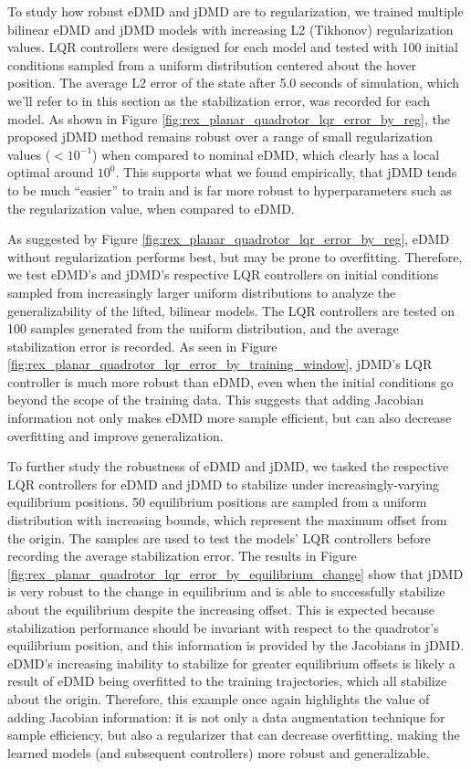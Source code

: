 \documentclass{article}
\begin{document}
To study how robust eDMD and jDMD are to regularization, we trained multiple bilinear eDMD
and jDMD models with increasing L2 (Tikhonov) regularization values. LQR controllers were
designed for each model and tested with 100 initial conditions sampled from a uniform
distribution centered about the hover position. The average L2 error of the state after 5.0
seconds of simulation, which we'll refer to in this section as the stabilization error, was
recorded for each model. As shown in Figure
\ref{fig:rex_planar_quadrotor_lqr_error_by_reg}, the proposed jDMD method remains robust
over a range of small regularization values ($<10^{-1}$) when compared to nominal eDMD, which 
clearly has a local optimal around $10^0$. This supports what we found empirically, that 
jDMD tends to be much ``easier'' to train and is far more robust to hyperparameters such as 
the regularization value, when compared to eDMD.

As suggested by Figure \ref{fig:rex_planar_quadrotor_lqr_error_by_reg}, eDMD without
regularization performs best, but may be prone to overfitting. Therefore, we test eDMD's and
jDMD's respective LQR controllers on initial conditions sampled from increasingly larger
uniform distributions to analyze the generalizability of the lifted, bilinear models. The
LQR controllers are tested on 100 samples generated from the uniform distribution, and the
average stabilization error is recorded. As seen in Figure
\ref{fig:rex_planar_quadrotor_lqr_error_by_training_window}, jDMD's LQR controller is much
more robust than eDMD, even when the initial conditions go beyond the scope of the training
data. This suggests that adding Jacobian information not only makes eDMD more sample
efficient, but can also decrease overfitting and improve generalization. 

To further study the robustness of eDMD and jDMD, we tasked the respective LQR controllers for eDMD and jDMD to stabilize under increasingly-varying equilibrium positions. 50 equilibrium positions are sampled from a uniform distribution with increasing bounds, which represent the maximum offset from the origin. The samples are used to test the models' LQR controllers before recording the average stabilization error. The results in Figure \ref{fig:rex_planar_quadrotor_lqr_error_by_equilibrium_change} show that jDMD is very robust to the change in equilibrium and is able to successfully stabilize about the equilibrium despite the increasing offset. This is expected because stabilization performance should be invariant with respect to the quadrotor's equilibrium position, and this information is provided by the Jacobians in jDMD. eDMD's increasing inability to stabilize for greater equilibrium offsets is likely a result of eDMD being overfitted to the training trajectories, which all stabilize about the origin. Therefore, this example once again highlights the value of adding Jacobian information: it is not only a data augmentation technique for sample efficiency, but also a regularizer that can decrease overfitting, making the learned models (and subsequent controllers) more robust and generalizable.
\end{document}

